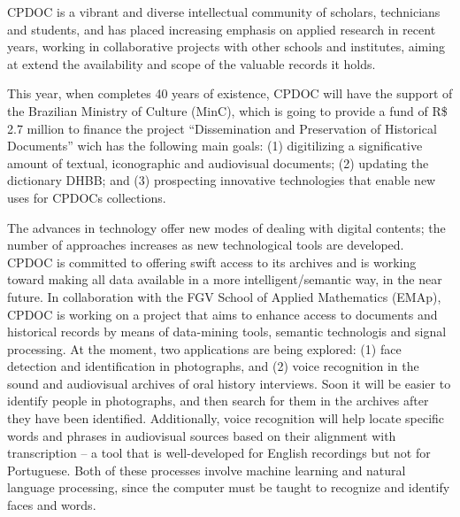 CPDOC is a vibrant and diverse intellectual community of scholars,
technicians and students, and has placed increasing emphasis on
applied research in recent years, working in collaborative projects
with other schools and institutes, aiming at extend the availability
and scope of the valuable records it holds. 


This year, when completes 40 years of existence, CPDOC will have the
support of the Brazilian Ministry of Culture (MinC), which is going to
provide a fund of R\$ 2.7 million to finance the project
``Dissemination and Preservation of Historical Documents'' wich has
the following main goals: (1) digitilizing a significative amount of
textual, iconographic and audiovisual documents; (2) updating the
dictionary DHBB; and (3) prospecting innovative technologies that
enable new uses for CPDOCs collections.

The advances in technology offer new modes of dealing with digital
contents; the number of approaches increases as new technological
tools are developed.  CPDOC is committed to offering swift access to
its archives and is working toward making all data available in a more
intelligent/semantic way, in the near future. In collaboration with
the FGV School of Applied Mathematics (EMAp), CPDOC is working on a
project that aims to enhance access to documents and historical
records by means of data-mining tools, semantic technologis and signal
processing. At the moment, two applications are being explored: (1)
face detection and identification in photographs, and (2) voice
recognition in the sound and audiovisual archives of oral history
interviews. Soon it will be easier to identify people in photographs,
and then search for them in the archives after they have been
identified. Additionally, voice recognition will help locate specific
words and phrases in audiovisual sources based on their alignment with
transcription -- a tool that is well-developed for English recordings
but not for Portuguese. Both of these processes involve machine
learning and natural language processing, since the computer must be
taught to recognize and identify faces and words.

   
